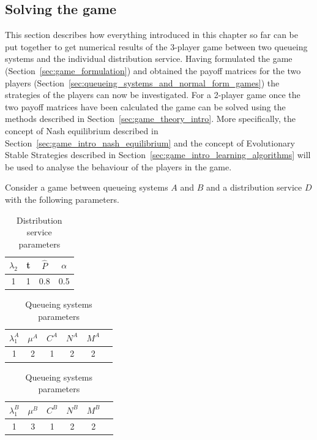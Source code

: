 \subsection{Solving the game}\label{sec:game_solving}

This section describes how everything introduced in this chapter so far can be
put together to get numerical results of the 3-player game between two queueing
systems and the individual distribution service.
Having formulated the game (Section~\ref{sec:game_formulation}) and obtained
the payoff matrices for the two players
(Section~\ref{sec:queueing_systems_and_normal_form_games}) the strategies of
the players can now be investigated.
For a 2-player game once the two payoff matrices have been calculated
the game can be solved using the methods described in
Section~\ref{sec:game_theory_intro}.
More specifically, the concept of Nash equilibrium described in
Section~\ref{sec:game_intro_nash_equilibrium} and the concept of Evolutionary
Stable Strategies described in Section~\ref{sec:game_intro_learning_algorithms}
will be used to analyse the behaviour of the players in the game.

Consider a game between queueing systems \(A\) and \(B\) and a distribution
service \(D\) with the following parameters.

\begin{table}[H]
    \caption{Distribution service parameters}
    \begin{center}
        \begin{tabular}{||c|c|c|c||}
            \hline
            \(\lambda_2\) & t & \(\hat{P}\) & \(\alpha\) \\
            \hline\hline
            1 & 1 & 0.8 & 0.5 \\
            \hline
        \end{tabular}
    \end{center}
    \label{tab:solving_game_dist_service_parameters}
\end{table}

\begin{table}[H]
    \caption{Queueing systems parameters}
    \begin{center}
        \begin{tabular}{||c|c|c|c|c|c||}
            \hline
            \(\lambda_1^A\) & \(\mu^A\) & \(C^A\) & \(N^A\) & \(M^A\) \\
            \hline
            1 & 2 & 1 & 2 & 2 \\
            \hline
        \end{tabular}

        \vspace{0.5cm}
        
        \begin{tabular}{||c|c|c|c|c|c||}
            \hline
            \(\lambda_1^B\) & \(\mu^B\) & \(C^B\) & \(N^B\) & \(M^B\) \\
            \hline
            1 & 3 & 1 & 2 & 2 \\
            \hline
        \end{tabular}
    \end{center}
    \label{tab:solving_game_queueing_systems_parameters}
\end{table}


